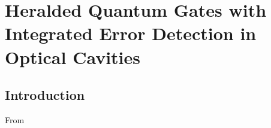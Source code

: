 \chapter{Heralded Quantum Gates with Integrated Error Detection in Optical Cavities}
\label{ch:Borregaard2015a}

\section{Introduction}
From \cite{Borregaard2015a}